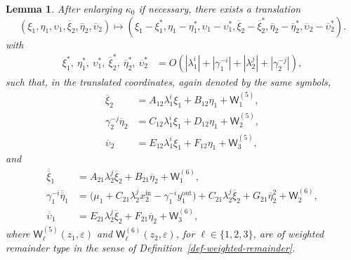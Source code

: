 \documentclass[11pt,a4paper]{article}
\theoremstyle{plain}
\newtheorem{lemma}[theorem]{Lemma}
\theoremstyle{definition}
\theoremstyle{plain}
\numberwithin{equation}{section}
\begin{document}
\begin{lemma}
\label{lem-shift-1}
After enlarging $\kappa_0$ if necessary, there exists a translation
\[
(\xi_1,\eta_1,\upsilon_1,\overline{\xi}_2,\overline{\eta}_2,\overline{\upsilon}_2)
\longmapsto
(\xi_1 - \xi_1^*,\eta_1 - \eta_1^*,\upsilon_1 - \upsilon_1^*,\overline{\xi}_2 - \overline{\xi}_2^*,\overline{\eta}_2 - \overline{\eta}_2^*,\overline{\upsilon}_2 - \overline{\upsilon}_2^*).
\]
with
\begin{equation}
\label{eq-shift1-est}
\begin{aligned}
\xi_1^*,\ \eta_1^*,\ \upsilon_1^*,\ \overline{\xi}_2^*,\ \overline{\eta}_2^*,\ \overline{\upsilon}_2^*
&=
O(|\lambda_1^i| + |\gamma_1^{-i}| + |\lambda_2^j| + |\gamma_2^{-j}|),
\end{aligned}
\end{equation}
such that, in the translated coordinates, again denoted by the same symbols,
\begin{equation}
\label{eq-FLGerase}
\begin{aligned}
\overline{\xi}_2
&=
A_{12}\lambda_1^i \xi_1
+
B_{12}\eta_1
+
\mathsf{W}_1^{(5)},
\\
\gamma_2^{-j}\overline{\eta}_2
&=
C_{12}\lambda_1^i \xi_1
+
D_{12}\eta_1
+
\mathsf{W}_2^{(5)},
\\
\overline{\upsilon}_2
&=
E_{12}\lambda_1^i \xi_1
+
F_{12}\eta_1
+
\mathsf{W}_3^{(5)},
\end{aligned}
\end{equation}
and
\begin{equation}
\label{eq-SLGerase}
\begin{aligned}
\overline{\overline{\xi}}_1
&=
A_{21}\lambda_2^j \overline{\xi}_2
+
B_{21}\overline{\eta}_2
+
\mathsf{W}_1^{(6)},
\\
\gamma_1^{-i} \overline{\overline{\eta}}_1
&=
\bigl(
\mu_1
+
C_{21} \lambda_2^j x_2^\mathrm{in}
-
\gamma_1^{-i} y_1^\mathrm{out}
\bigr)
+
C_{21} \lambda_2^j \overline{\xi}_2
+
G_{21} \overline{\eta}_2^2
+
\mathsf{W}_2^{(6)},
\\
\overline{\overline{\upsilon}}_1
&=
E_{21}\lambda_2^j \overline{\xi}_2
+
F_{21}\overline{\eta}_2
+
\mathsf{W}_3^{(6)},
\end{aligned}
\end{equation}
where $\mathsf{W}_\ell^{(5)}(z_1,\varepsilon)$ and $\mathsf{W}_\ell^{(6)}(z_2,\varepsilon)$, for $\ell \in \{1,2,3\}$, are of weighted remainder type in the sense of Definition~\ref{def-weighted-remainder}.
\end{lemma}
\end{document}

